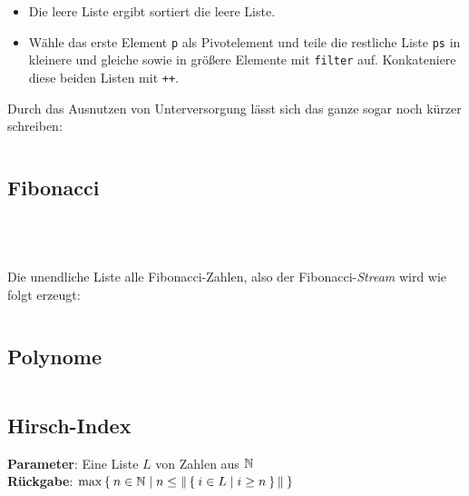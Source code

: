 \begin{itemize}
    \item Die leere Liste ergibt sortiert die leere Liste.
    \item Wähle das erste Element \texttt{p} als Pivotelement und
          teile die restliche Liste \texttt{ps} in kleinere und 
          gleiche sowie in größere Elemente mit \texttt{filter} auf.
          Konkateniere diese beiden Listen mit \texttt{++}.
\end{itemize}

Durch das Ausnutzen von Unterversorgung lässt
sich das ganze sogar noch kürzer schreiben:

\inputminted[linenos, numbersep=5pt, tabsize=4, frame=lines, label=qsort.hs]{haskell}{scripts/haskell/qsort-unterversorg.hs}

\subsection{Fibonacci}
\inputminted[linenos, numbersep=5pt, tabsize=4, frame=lines, label=fibonacci.hs]{haskell}{scripts/haskell/fibonacci.hs}
\inputminted[linenos, numbersep=5pt, tabsize=4, frame=lines, label=fibonacci-akk.hs]{haskell}{scripts/haskell/fibonacci-akk.hs}
\inputminted[linenos, numbersep=5pt, tabsize=4, frame=lines, label=fibonacci-zip.hs]{haskell}{scripts/haskell/fibonacci-zip.hs}
\inputminted[linenos, numbersep=5pt, tabsize=4, frame=lines, label=fibonacci-pattern-matching.hs]{haskell}{scripts/haskell/fibonacci-pattern-matching.hs}

Die unendliche Liste alle Fibonacci-Zahlen, also der Fibonacci-\textit{Stream}
wird wie folgt erzeugt:

\inputminted[linenos, numbersep=5pt, tabsize=4, frame=lines, label=fibonacci-stream.hs]{haskell}{scripts/haskell/fibonacci-stream.hs}

\subsection{Polynome}%
\inputminted[linenos, numbersep=5pt, tabsize=4, frame=lines, label=polynome.hs]{haskell}{scripts/haskell/polynome.hs}

\subsection{Hirsch-Index}%
\textbf{Parameter}: Eine Liste $L$ von Zahlen aus $\mathbb{N}$\\
\textbf{Rückgabe}: $\max \Set{n \in \ensuremath{\mathbb{N}}| n \leq \|\Set{i \in L | i \geq n}\|}$

